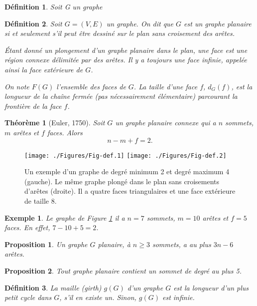 \documentclass[10pt,a4paper]{article}
\newtheorem{definition}{Définition}
\newtheorem{theorem}{Théorème}
\newtheorem{proposition}{Proposition}
\newtheorem{exemple}{Exemple}
\begin{document}
\begin{definition}
Soit G un graphe  
\end{definition}

\begin{definition}
Soit $G=(V,E)$ un graphe. On dit que $G$ est un graphe \emph{planaire} si et seulement s'il peut être dessiné sur le plan sans croisement des arêtes. 

Étant donné un plongement d'un graphe planaire dans le plan, une \emph{face} est une région connexe délimitée par des arêtes. Il y a toujours une face infinie, appelée ainsi la \emph{face extérieure} de $G$.

On note $F(G)$ l'ensemble des faces de $G$. La \emph{taille} d'une face $f$, $d_G(f)$, est la longueur de la chaîne fermée (pas nécessairement élémentaire) parcourant la frontière de la face $f$.
\end{definition}

\begin{theorem}[Euler, 1750]
Soit $G$ un graphe planaire connexe qui a $n$ sommets, $m$ arêtes et $f$ faces. Alors
$$
n - m + f = 2.
$$
\end{theorem}

\begin{figure}[ht]
\centerline{
\texttt{[image: ./Figures/Fig-def.1]}
\hfil
\texttt{[image: ./Figures/Fig-def.2]}
}
\caption{Un exemple d'un graphe de degré minimum 2 et degré maximum 4 (gauche). Le même graphe plongé dans le plan sans croisements d'arêtes (droite). Il a quatre faces triangulaires et une face extérieure de taille 8.}
\label{fig:ex}
\end{figure}

\begin{exemple}
Le graphe de Figure \ref{fig:ex} il a $n=7$ sommets, $m=10$ arêtes et $f=5$ faces. En effet, $7 - 10 + 5 = 2$.
\end{exemple}


\begin{proposition}
Un graphe $G$ planaire, à $n \geq 3$ sommets, a au plus $3n - 6$ arêtes.
\end{proposition}

\begin{proposition}
Tout graphe planaire contient un sommet de degré au plus 5.
\end{proposition}

\begin{definition}
La \emph{maille (girth)} $g(G)$ d'un graphe $G$ est la longueur d'un plus petit cycle dans $G$, s'il en existe un. Sinon, $g(G)$ est infinie. %
\end{definition}
\end{document}
